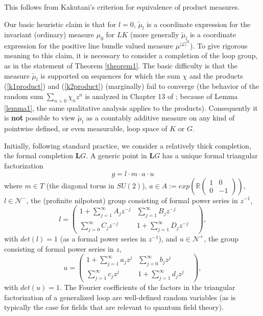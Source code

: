 \documentclass{amsart}
\theoremstyle{conjecture}
\theoremstyle{definition}
\theoremstyle{question}
\theoremstyle{questions}
\theoremstyle{remark}
\theoremstyle{remarks}
\theoremstyle{example}
\numberwithin{equation}{section}
\begin{document}
This follows from Kakutani's criterion
for equivalence of product measures.

Our basic heuristic claim is that for $l=0$, $\tilde{\mu}_l$ is a
coordinate expression for the invariant (ordinary) measure $\mu_0$ for $LK$ (more generally $\tilde{\mu}_l$
is a coordinate expression for the positive line bundle valued measure $\mu^{|\mathcal L|^{2l}}$). To give
rigorous meaning to this claim, it is necessary to consider a
completion of the loop group, as in the statement of Theorem
\ref{theorem1}. The basic difficulty is that the measure
$\tilde{\mu}_l$ is supported on sequences for which the sum $\chi$
and the products
(\ref{k1product}) and (\ref{k2product}) (marginally) fail to
converge (the behavior of the random sum
$\sum_{n>0}\chi_n z^n$ is analyzed in Chapter 13
of \cite{K}; because of Lemma \ref{lemma1}, the same qualitative analysis applies
to the products). Consequently it is {\bf not} possible to view $\tilde{\mu}_l$ as a
countably additive measure on any kind of pointwise defined, or
even measurable, loop space of $K$ or $G$.

Initially, following standard practice, we consider a relatively
thick completion, the formal completion $\mathbf LG$. A generic point in
$\mathbf LG$ has a unique formal triangular factorization
\begin{equation}\label{trifactorization2}g=l\cdot m \cdot a\cdot u \end{equation}
where $m\in T$ (the diagonal
torus in $SU(2)$),
$a\in A:=exp(\mathbb R\left(\begin{matrix} 1&0\\
0&-1\end{matrix} \right))$, $l\in \mathcal N^{-}$, the (profinite
nilpotent) group consisting of formal power series in $z^{-1}$,
$$l=\left(\begin{matrix} 1+\sum_{j=1}^{\infty}A_jz^{-j}&\sum_{j=1}^{\infty}B_jz^{
-j}\\
\sum_{j=0}^{\infty}C_jz^{-j}&1+\sum_{j=1}^{\infty}D_jz^{-j}&\end{matrix}
\right ),$$ with $det(l)=1$ (as a formal power series in
$z^{-1}$), and $u\in \mathcal N^{+}$, the group consisting of
formal power series in $z$,
$$u=\left(\begin{matrix} 1+\sum_{j=1}^{\infty}a_jz^j&\sum_{j=0}^{\infty}b_jz^j\\
\sum_{j=1}^{\infty}c_jz^j&1+\sum_{j=1}^{\infty}d_jz^j&\end{matrix}
\right),$$ with $det(u)=1$. The Fourier coefficients of the factors
in the triangular factorization of a generalized loop are well-defined
random variables (as is typically the case for fields that are
relevant to quantum field theory).
\end{document}
